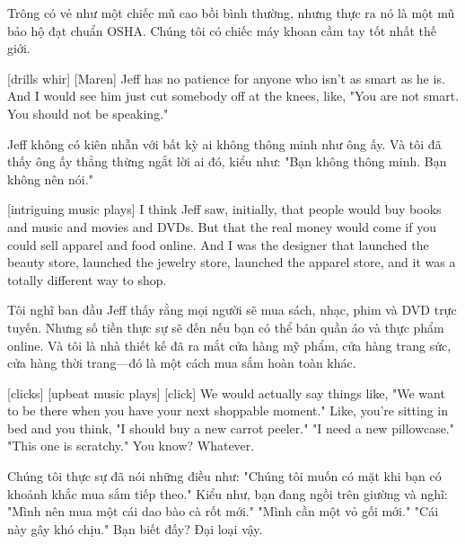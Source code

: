 \documentclass[a4paper]{article}
\begin{document}
	\begin{vietnamese-v2}
		[Jeff] Trông có vẻ như một chiếc mũ cao bồi bình thường, nhưng thực ra nó là một mũ bảo hộ đạt chuẩn OSHA. Chúng tôi có chiếc máy khoan cầm tay tốt nhất thế giới.	
	\end{vietnamese-v2}
	
	[drills whir]
	[Maren] Jeff has no patience for anyone who isn't as smart as he is.
	And I would see him just cut somebody off at the knees, like, "You are not smart. You should not be speaking."
	
	\begin{vietnamese-v2}
		 Jeff không có kiên nhẫn với bất kỳ ai không thông minh như ông ấy. 
		Và tôi đã thấy ông ấy thẳng thừng ngắt lời ai đó, kiểu như: "Bạn không thông minh. Bạn không nên nói."
	\end{vietnamese-v2}
	
	[intriguing music plays]
	I think Jeff saw, initially, that people would buy books and music and movies and DVDs.
	But that the real money would come if you could sell apparel and food online.
	And I was the designer that launched the beauty store, launched the jewelry store, launched the apparel store, and it was a totally different way to shop.
	
	\begin{vietnamese-v2}
		 Tôi nghĩ ban đầu Jeff thấy rằng mọi người sẽ mua sách, nhạc, phim và DVD trực tuyến. 
		Nhưng số tiền thực sự sẽ đến nếu bạn có thể bán quần áo và thực phẩm online. 
		Và tôi là nhà thiết kế đã ra mắt cửa hàng mỹ phẩm, cửa hàng trang sức, cửa hàng thời trang—đó là một cách mua sắm hoàn toàn khác.
	\end{vietnamese-v2}
	
	[clicks]
	[upbeat music plays]
	[click]
	We would actually say things like, "We want to be there when you have your next shoppable moment."
	Like, you're sitting in bed and you think, "I should buy a new carrot peeler."
	"I need a new pillowcase."
	"This one is scratchy." You know? Whatever.
	
	\begin{vietnamese-v2}
		Chúng tôi thực sự đã nói những điều như: "Chúng tôi muốn có mặt khi bạn có khoảnh khắc mua sắm tiếp theo." 
		Kiểu như, bạn đang ngồi trên giường và nghĩ: "Mình nên mua một cái dao bào cà rốt mới." 
		"Mình cần một vỏ gối mới." 
		"Cái này gây khó chịu." Bạn biết đấy? Đại loại vậy.
	\end{vietnamese-v2}
	
\end{document}
